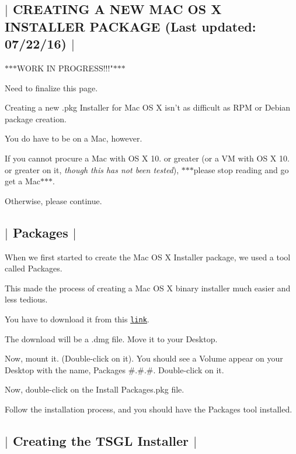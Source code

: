 

 \subsection*{$\vert$ C\-R\-E\-A\-T\-I\-N\-G A N\-E\-W M\-A\-C O\-S X I\-N\-S\-T\-A\-L\-L\-E\-R P\-A\-C\-K\-A\-G\-E (Last updated\-: 07/22/16) $\vert$ }

$\ast$$\ast$$\ast$\-W\-O\-R\-K I\-N P\-R\-O\-G\-R\-E\-S\-S!!!"$\ast$$\ast$$\ast$
\begin{DoxyItemize}
\item Need to finalize this page.
\end{DoxyItemize}

Creating a new .pkg Installer for Mac O\-S X isn't as difficult as R\-P\-M or Debian package creation.

You do have to be on a Mac, however.

If you cannot procure a Mac with O\-S X 10. or greater (or a V\-M with O\-S X 10. or greater on it, {\itshape though this has not been tested}), $\ast$$\ast$$\ast$please stop reading and go get a Mac$\ast$$\ast$$\ast$.

Otherwise, please continue. 

 \subsection*{$\vert$ Packages $\vert$ }

When we first started to create the Mac O\-S X Installer package, we used a tool called {\ttfamily Packages}.

This made the process of creating a Mac O\-S X binary installer much easier and less tedious.

You have to download it from this \href{http://s.sudre.free.fr/Software/Packages/about.html}{\tt link}.

The download will be a {\ttfamily .dmg} file. Move it to your {\ttfamily Desktop}.

Now, mount it. (Double-\/click on it). You should see a Volume appear on your {\ttfamily Desktop} with the name, {\ttfamily Packages \#.\#.\#}. Double-\/click on it.

Now, double-\/click on the {\ttfamily Install Packages.\-pkg} file.

Follow the installation process, and you should have the {\ttfamily Packages} tool installed. 

 \subsection*{$\vert$ Creating the T\-S\-G\-L Installer $\vert$ }

